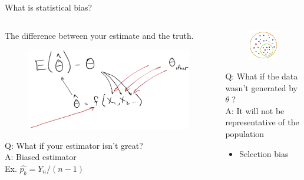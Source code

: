 \documentclass[aspectratio=169]{../latex_main/tntbeamer}  %
\begin{document}
	
	\begin{frame}{What is statistical bias?}
	    \begin{columns}
	        \begin{column}{.4\textwidth}
	           The difference between your estimate and the truth.
	           \begin{figure}
	               \includegraphics[scale=.31]{Bild30}
	           \end{figure}
	           Q: What if your estimator isn’t great?\\
	           A: Biased estimator\\
	           Ex. $ \hat{p_b}= Y_n / (n - 1)$

	        \end{column}
	        
	        \begin{column}{.4\textwidth}
	           \begin{figure}
	               \includegraphics[scale=.5]{Bild31}
	           \end{figure}
	           Q: What if the data wasn’t generated by $\theta$ ?\\
	           \bigskip
	           A: It will not be representative of the population
                \begin{itemize}
                    \item Selection bias
                \end{itemize}

	        \end{column}
	        \end{columns}

	    
	\end{frame}
	
\end{document}
